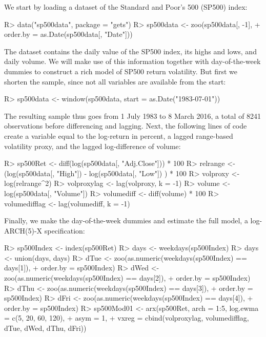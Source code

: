 \documentclass[article,nojss]{jss}
\begin{document}
We start by loading a dataset of the Standard and Poor's 500 (SP500) index:
%
\begin{CodeChunk}
\begin{CodeInput}
R> data("sp500data", package = "gets")
R> sp500data <- zoo(sp500data[, -1],
+    order.by = as.Date(sp500data[, "Date"]))
\end{CodeInput}
\end{CodeChunk}
%
The dataset contains the daily value of the SP500 index, its highs and lows, and daily volume. We will make use of this information together with day-of-the-week dummies to construct a rich model of SP500 return volatility. But first we shorten the sample, since not all variables are available from the start:
%
\begin{CodeChunk}
\begin{CodeInput}
R> sp500data <- window(sp500data, start = as.Date("1983-07-01"))
\end{CodeInput}
\end{CodeChunk}
%
The resulting sample thus goes from 1 July 1983 to 8 March 2016, a
total of 8241 observations before differencing and lagging. Next, the
following lines of code create a variable equal to the log-return in
percent, a lagged range-based volatility proxy, and the lagged
log-difference of volume:
%
\begin{CodeChunk}
\begin{CodeInput}
R> sp500Ret <- diff(log(sp500data[, "Adj.Close"])) * 100
R> relrange <- (log(sp500data[, "High"]) - log(sp500data[, "Low"]) ) * 100
R> volproxy <- log(relrange^2)
R> volproxylag <- lag(volproxy, k = -1)
R> volume <- log(sp500data[, "Volume"])
R> volumediff <- diff(volume) * 100
R> volumedifflag <- lag(volumediff, k = -1)
\end{CodeInput}
\end{CodeChunk}
%
Finally, we make the day-of-the-week dummies and estimate the full model, a log-ARCH(5)-X specification:
%
\begin{CodeChunk}
\begin{CodeInput}
R> sp500Index <- index(sp500Ret)
R> days <- weekdays(sp500Index)
R> days <- union(days, days)
R> dTue <- zoo(as.numeric(weekdays(sp500Index) == days[1]),
+    order.by = sp500Index)
R> dWed <- zoo(as.numeric(weekdays(sp500Index) == days[2]),
+    order.by = sp500Index)
R> dThu <- zoo(as.numeric(weekdays(sp500Index) == days[3]),
+    order.by = sp500Index)
R> dFri <- zoo(as.numeric(weekdays(sp500Index) == days[4]),
+    order.by = sp500Index)
R> sp500Mod01 <- arx(sp500Ret, arch = 1:5, log.ewma = c(5, 20, 60, 120),
+    asym = 1,
+    vxreg = cbind(volproxylag, volumedifflag, dTue, dWed, dThu, dFri))
\end{CodeInput}
\end{CodeChunk}
\end{document}
